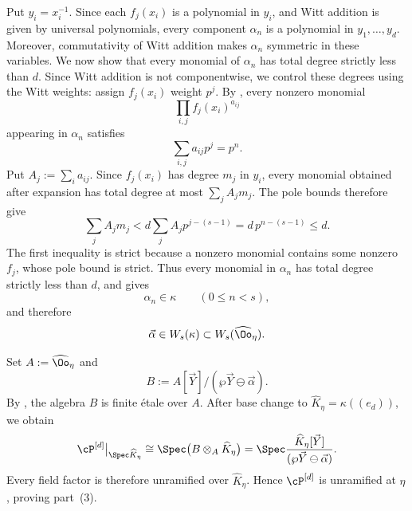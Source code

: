 Put $y_i=x_i^{-1}$. Since each $f_j(x_i)$ is a polynomial in $y_i$, and
Witt addition is given by universal polynomials, every component $\alpha_n$
is a polynomial in $y_1,\dots,y_d$. Moreover, commutativity of Witt addition
makes $\alpha_n$ symmetric in these variables. We now show that every monomial
of $\alpha_n$ has total degree strictly less than $d$. Since Witt addition is
not componentwise, we control these degrees using the Witt weights: assign
$f_j(x_i)$ weight $p^j$. By
, every nonzero monomial
\[
    \prod_{i,j}f_j(x_i)^{a_{ij}}
\]
appearing in $\alpha_n$ satisfies
\[
    \sum_{i,j}a_{ij}p^j=p^n.
\]
Put $A_j:=\sum_i a_{ij}$. Since $f_j(x_i)$ has degree $m_j$ in $y_i$,
every monomial obtained after expansion has total degree at most
$\sum_jA_jm_j$. The pole bounds therefore give
\[
    \sum_jA_jm_j
       <d\sum_jA_jp^{j-(s-1)}
       =d\,p^{n-(s-1)}
       \leq d.
\]
The first inequality is strict because a nonzero monomial contains some
nonzero $f_j$, whose pole bound is strict. Thus every monomial in $\alpha_n$
has total degree strictly less than $d$, and
 gives
\[
    \alpha_n\in\kappa\qquad(0\leq n<s),
\]
and therefore
\[
    \vec\alpha\in W_s(\kappa)\subset W_s(\widehat\Oo_\eta).
\]

Set $A:=\widehat\Oo_\eta$ and
\[
    B:=A[\vec Y]/(\wp\vec Y\ominus\vec\alpha).
\]
By , the algebra $B$ is finite \'etale over
$A$. After base change to $\widehat K_\eta=\kappa((e_d))$, we obtain
\[
    \cP^{[d]}\big|_{\Spec\widehat K_\eta}
       \cong
    \Spec\bigl(B\otimes_A\widehat K_\eta\bigr)
       =
    \Spec\frac{\widehat K_\eta[\vec Y]}
                   {(\wp\vec Y\ominus\vec\alpha)}.
\]
Every field factor is therefore unramified over $\widehat K_\eta$. Hence
$\cP^{[d]}$ is unramified at $\eta$, proving part~(3).
